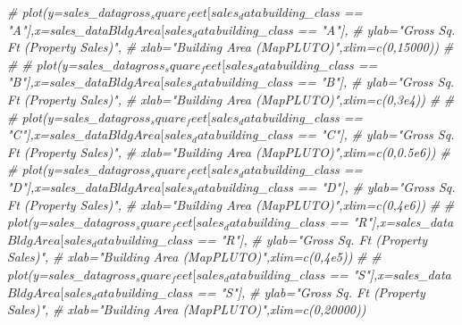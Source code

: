 \documentclass[]{article}
\newenvironment{Shaded}{\begin{snugshade}}{\end{snugshade}}
\newcommand{\CommentTok}[1]{\textcolor[rgb]{0.56,0.35,0.01}{\textit{#1}}}
\begin{document}
\begin{Shaded}
\begin{Highlighting}[]
\CommentTok{# plot(y=sales_data$gross_square_feet[sales_data$building_class == "A"],x=sales_data$BldgArea[sales_data$building_class == "A"],}
\CommentTok{#      ylab="Gross Sq. Ft (Property Sales)",}
\CommentTok{#      xlab="Building Area (MapPLUTO)",xlim=c(0,15000))}
\CommentTok{# }
\CommentTok{# }
\CommentTok{# plot(y=sales_data$gross_square_feet[sales_data$building_class == "B"],x=sales_data$BldgArea[sales_data$building_class == "B"],}
\CommentTok{#      ylab="Gross Sq. Ft (Property Sales)",}
\CommentTok{#      xlab="Building Area (MapPLUTO)",xlim=c(0,3e4))}
\CommentTok{# }
\CommentTok{# }
\CommentTok{# plot(y=sales_data$gross_square_feet[sales_data$building_class == "C"],x=sales_data$BldgArea[sales_data$building_class == "C"],}
\CommentTok{#      ylab="Gross Sq. Ft (Property Sales)",}
\CommentTok{#      xlab="Building Area (MapPLUTO)",xlim=c(0,0.5e6))}
\CommentTok{# }
\CommentTok{# plot(y=sales_data$gross_square_feet[sales_data$building_class == "D"],x=sales_data$BldgArea[sales_data$building_class == "D"],}
\CommentTok{#      ylab="Gross Sq. Ft (Property Sales)",}
\CommentTok{#      xlab="Building Area (MapPLUTO)",xlim=c(0,4e6))}
\CommentTok{# }
\CommentTok{# plot(y=sales_data$gross_square_feet[sales_data$building_class == "R"],x=sales_data$BldgArea[sales_data$building_class == "R"],}
\CommentTok{#      ylab="Gross Sq. Ft (Property Sales)",}
\CommentTok{#      xlab="Building Area (MapPLUTO)",xlim=c(0,4e5))}
\CommentTok{# }
\CommentTok{# plot(y=sales_data$gross_square_feet[sales_data$building_class == "S"],x=sales_data$BldgArea[sales_data$building_class == "S"],}
\CommentTok{#      ylab="Gross Sq. Ft (Property Sales)",}
\CommentTok{#      xlab="Building Area (MapPLUTO)",xlim=c(0,20000))}
\end{Highlighting}
\end{Shaded}
\end{document}
